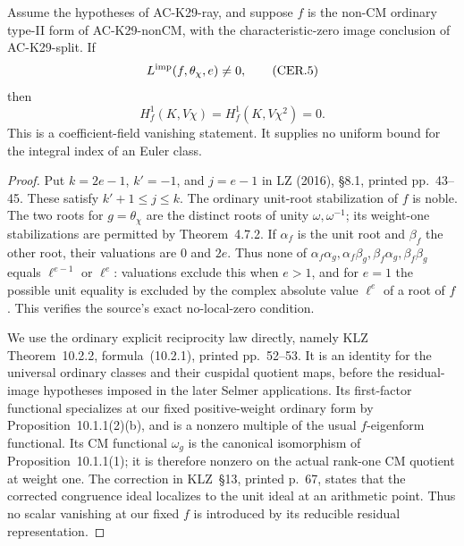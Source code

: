 \begin{theorem}
\label{AC-K29-lower}
Assume the hypotheses of AC-K29-ray, and suppose $f$ is
the non-CM ordinary type-II form of AC-K29-nonCM, with
the characteristic-zero image conclusion of AC-K29-split.
If
\[
                 L^{\rm imp}(f,\theta_\chi,e)\ne0,
                                                            \tag{CER.5}
\]
then
\[
             H^1_f(K,V\chi)=H^1_f(K,V\chi^2)=0.
                                                            \tag{CER.6}
\]
This is a coefficient-field vanishing statement.  It supplies
no uniform bound for the integral index of an Euler class.
\end{theorem}
\begin{proof}
Put $k=2e-1$, $k'=-1$, and $j=e-1$ in LZ (2016),
\S8.1, printed pp.~43--45.  These satisfy
$k'+1\le j\le k$.  The ordinary unit-root stabilization
of $f$ is noble.  The two roots for $g=\theta_\chi$ are
the distinct roots of unity $\omega,\omega^{-1}$; its
weight-one stabilizations are permitted by Theorem~4.7.2.
If $\alpha_f$ is the unit root and $\beta_f$ the other
root, their valuations are $0$ and $2e$.  Thus none of
$\alpha_f\alpha_g,\alpha_f\beta_g,
\beta_f\alpha_g,\beta_f\beta_g$ equals
$\ell^{e-1}$ or $\ell^e$: valuations exclude this when
$e>1$, and for $e=1$ the possible unit equality is excluded
by the complex absolute value $\ell^e$ of a root of $f$.
This verifies the source's exact no-local-zero condition.

We use the ordinary explicit reciprocity law directly,
namely KLZ Theorem~10.2.2, formula~(10.2.1), printed
pp.~52--53.  It is an identity for the universal ordinary
classes and their cuspidal quotient maps, before the
residual-image hypotheses imposed in the later Selmer
applications.  Its first-factor functional specializes at
our fixed positive-weight ordinary form by
Proposition~10.1.1(2)(b), and is a nonzero multiple of the
usual $f$-eigenform functional.  Its CM functional
$\omega_g$ is the canonical isomorphism of
Proposition~10.1.1(1); it is therefore nonzero on the actual
rank-one CM quotient at weight one.  The correction in
KLZ~\S13, printed p.~67, states that the corrected
congruence ideal localizes to the unit ideal at an arithmetic
point.  Thus no scalar vanishing at our fixed $f$ is
introduced by its reducible residual representation.


\end{proof}
